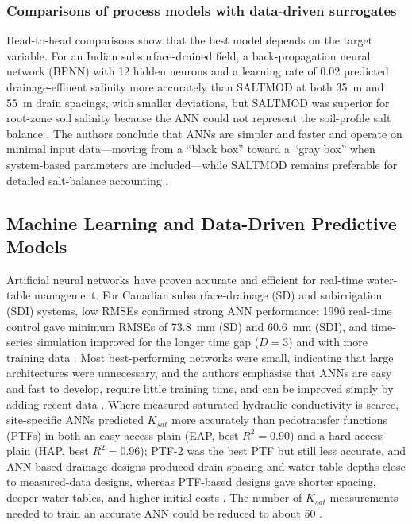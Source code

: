 \subsubsection{Comparisons of process models with data-driven surrogates}

Head-to-head comparisons show that the best model depends on the target
variable. For an Indian subsurface-drained field, a back-propagation neural
network (BPNN) with 12 hidden neurons and a learning rate of 0.02 predicted
drainage-effluent salinity more accurately than SALTMOD at both 35~m and 55~m
drain spacings, with smaller deviations, but SALTMOD was superior for root-zone
soil salinity because the ANN could not represent the soil-profile salt balance
\parencite{Sarangi2006}. The authors conclude that ANNs are simpler and faster
and operate on minimal input data---moving from a ``black box'' toward a ``gray
box'' when system-based parameters are included---while SALTMOD remains
preferable for detailed salt-balance accounting \parencite{Sarangi2006}.

\subsection{Machine Learning and Data-Driven Predictive Models}

Artificial neural networks have proven accurate and efficient for real-time
water-table management. For Canadian subsurface-drainage (SD) and
subirrigation (SDI) systems, low RMSEs confirmed strong ANN performance: 1996
real-time control gave minimum RMSEs of 73.8~mm (SD) and 60.6~mm (SDI), and
time-series simulation improved for the longer time gap ($D=3$) and with more
training data \parencite{Yang2000}. Most best-performing networks were small,
indicating that large architectures were unnecessary, and the authors emphasise
that ANNs are easy and fast to develop, require little training time, and can be
improved simply by adding recent data \parencite{Yang2000}. Where measured
saturated hydraulic conductivity is scarce, site-specific ANNs predicted $K_{sat}$
more accurately than pedotransfer functions (PTFs) in both an easy-access plain
(EAP, best $R^2=0.90$) and a hard-access plain (HAP, best $R^2=0.96$); PTF-2 was
the best PTF but still less accurate, and ANN-based drainage designs produced
drain spacing and water-table depths close to measured-data designs, whereas
PTF-based designs gave shorter spacing, deeper water tables, and higher initial
costs \parencite{Ellafi2021}. The number of $K_{sat}$ measurements needed to
train an accurate ANN could be reduced to about 50 \parencite{Ellafi2021}.

